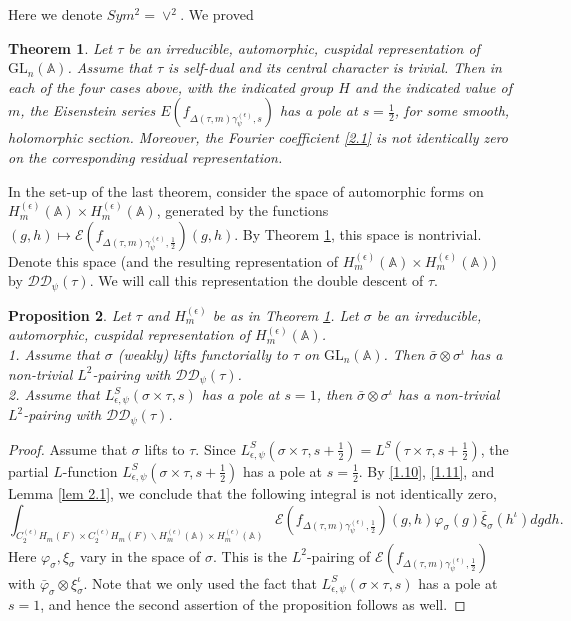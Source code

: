 \documentclass[12pts]{amsart}
\newcommand{\BA}{{\mathbb {A}}}
\newcommand{\GL}{{\mathrm{GL}}}
\newtheorem{thm}{Theorem}[section]
\newtheorem{prop}[thm]{Proposition}
\begin{document}
Here we denote $Sym^2=\vee^2$. We proved 
\begin{thm}\label{thm 2.2}
Let $\tau$ be an irreducible, automorphic, cuspidal representation of $\GL_n(\BA)$. Assume that $\tau$ is self-dual and its central character is trivial. Then in each of the four cases above, with the indicated group $H$ and the indicated value of $m$, the Eisenstein series  $E(f_{\Delta(\tau,m)\gamma^{(\epsilon)}_\psi,s})$ has a pole at $s=\frac{1}{2}$, for some smooth, holomorphic section. Moreover, the Fourier coefficient \eqref{2.1} is not identically zero on the corresponding residual representation.
\end{thm}	
In the set-up of the last theorem, consider the space of automorphic forms on $H^{(\epsilon)}_m(\BA)\times H^{(\epsilon)}_m(\BA)$, generated by the functions $(g,h)\mapsto \mathcal{E}(f_{\Delta(\tau,m)\gamma^{(\epsilon)}_\psi,\frac{1}{2}})(g,h)$. By Theorem \ref{thm 2.2}, this space is nontrivial. Denote this space (and the resulting representation of $H^{(\epsilon)}_m(\BA)\times H^{(\epsilon)}_m(\BA)$) by 
$\mathcal{D}\mathcal{D}_\psi(\tau)$. We will call this representation the double descent of $\tau$. 

\begin{prop}\label{prop 2.3}
Let $\tau$ and $H^{(\epsilon)}_m$ be as in Theorem \ref{thm 2.2}. Let $\sigma$ be an irreducible, automorphic, cuspidal representation of $H^{(\epsilon)}_m(\BA)$. \\
1. Assume that $\sigma$ (weakly) lifts functorially to $\tau$ on $\GL_n(\BA)$. Then $\bar{\sigma} \otimes \sigma^\iota$ has a non-trivial $L^2$-pairing with $\mathcal{D}\mathcal{D}_\psi(\tau)$.\\ 
2. Assume that $L^S_{\epsilon,\psi}(\sigma \times \tau,s)$ has a pole at $s=1$, then $\bar{\sigma} \otimes \sigma^\iota$ has a non-trivial $L^2$-pairing with $\mathcal{D}\mathcal{D}_\psi(\tau)$.\\
\end{prop}
\begin{proof}
Assume that $\sigma$ lifts to $\tau$. Since $L^S_{\epsilon,\psi}(\sigma \times \tau,s+\frac{1}{2})=L^S(\tau \times \tau,s+\frac{1}{2})$, the partial $L$-function $L^S_{\epsilon,\psi}(\sigma \times \tau,s+\frac{1}{2})$ has a pole at $s=\frac{1}{2}$. By \eqref{1.10}, \eqref{1.11}, and Lemma \ref{lem 2.1}, we conclude that the following integral is not identically zero, 
\begin{equation}\label{2.2}
\int_{C_2^{(\epsilon)}H_m(F)\times C_2^{(\epsilon)}H_m(F)\backslash
	H^{(\epsilon)}_m(\BA)\times H^{(\epsilon)}_m(\BA)}\mathcal{E}(f_{\Delta(\tau,m)\gamma^{(\epsilon)}_\psi,\frac{1}{2}})(g,h)\varphi_\sigma(g)\bar{\xi}_\sigma(h^\iota)dgdh.
\end{equation}
Here $\varphi_\sigma, \xi_\sigma$ vary in the space of $\sigma$. This is the $L^2$-pairing of $\mathcal{E}(f_{\Delta(\tau,m)\gamma^{(\epsilon)}_\psi,\frac{1}{2}})$ with $\bar{\varphi}_\sigma\otimes \xi_\sigma^\iota$. Note that we only used the fact that $L^S_{\epsilon,\psi}(\sigma \times \tau,s)$ has a pole at $s=1$, and hence the second assertion of the proposition follows as well.
\end{proof}
\end{document}
